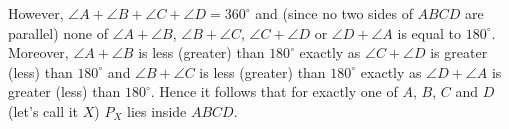 \documentclass[a4paper,12pt]{article}
\begin{document}
\begin{enumerate}
  However, $\angle A + \angle B + \angle C + \angle D = 360^\circ$ and (since no two sides of $ABCD$ are parallel) none of $\angle A + \angle B$, $\angle B + \angle C$, $\angle C + \angle D$ or $\angle D + \angle A$ is equal to $180^\circ$. Moreover, $\angle A + \angle B$ is less (greater) than $180^\circ$ exactly as $\angle C + \angle D$ is greater (less) than $180^\circ$ and $\angle B + \angle C$ is less (greater) than $180^\circ$ exactly as $\angle D + \angle A$ is greater (less) than $180^\circ$. Hence it follows that for exactly one of $A$, $B$, $C$ and $D$ (let's call it $X$) $P_X$ lies inside $ABCD$.
  
  
\end{enumerate}


\centering
\begin{BVerbatim}
\end{BVerbatim}
\end{document}
